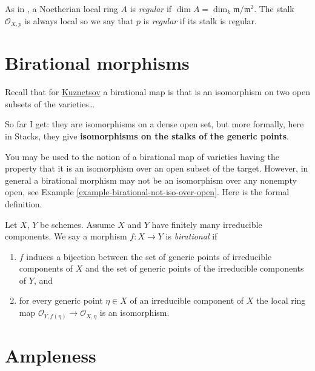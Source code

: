 As in \cite{sea},
a Noetherian local ring $A$ is {\it regular} 
if $\dim A = \dim_k\mathfrak{m}/\mathfrak{m}^2$.
The stalk $\mathcal{O}_{X,p}$ is
always local
so we say that $p$ is {\it regular} 
if its stalk is regular.

\section{Birational morphisms}
\label{section-birational}

\noindent
Recall that for
\href{https://www.mathnet.ru/php/
presentation.phtml?option_lang=eng&presentid=337}{Kuznetsov}
a birational map is that is an isomorphism on two open subsets
of the varieties…

So far I get: they are isomorphisms on a dense open set,
but more formally, here in Stacks, they give
{\bf isomorphisms on the stalks of the generic points}.

\medskip\noindent
You may be used to the notion of a birational map of varieties
having the property that it is an isomorphism over an open subset
of the target. However, in general a birational morphism may
not be an isomorphism over any nonempty open, see
Example \ref{example-birational-not-iso-over-open}.
Here is the formal definition.

\begin{definition}
\label{definition-birational}
\begin{reference}
\cite[(2.2.9)]{EGA1}
\end{reference}
Let $X$, $Y$ be schemes. Assume $X$ and $Y$ have finitely many
irreducible components. We say a morphism $f : X \to Y$ is
{\it birational} if
\begin{enumerate}
\item $f$ induces a bijection between the set of generic points
of irreducible components of $X$ and the set of generic points
of the irreducible components of $Y$, and
\item for every generic point $\eta \in X$ of an irreducible component
of $X$ the local ring map
$\mathcal{O}_{Y, f(\eta)} \to \mathcal{O}_{X, \eta}$
is an isomorphism.
\end{enumerate}
\end{definition}

\section{Ampleness}
\label{section-ampleness}

